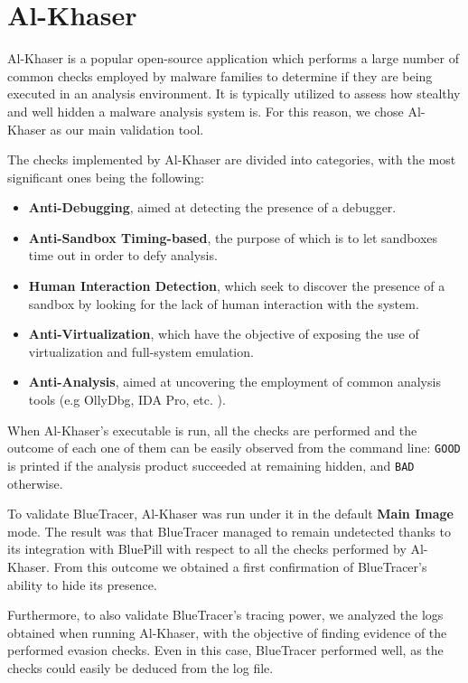 \vspace{-2cm}
\section{Al-Khaser}
Al-Khaser \cite{AlK} is a popular open-source application which performs a large number of common checks employed by malware families to determine if they are being executed in an analysis environment. It is typically utilized to assess how stealthy and well hidden a malware analysis system is. For this reason, we chose Al-Khaser as our main validation tool.

The checks implemented by Al-Khaser are divided into categories, with the most significant ones being the following:
\begin{itemize}
\item \textbf{Anti-Debugging}, aimed at detecting the presence of a debugger.
\item \textbf{Anti-Sandbox Timing-based}, the purpose of which is to let sandboxes time out in order to defy analysis. 
\item \textbf{Human Interaction Detection}, which seek to discover the presence of a sandbox by looking for the lack of human interaction with the system.
\item \textbf{Anti-Virtualization}, which have the objective of exposing the use of virtualization and full-system emulation. 
\item \textbf{Anti-Analysis}, aimed at uncovering the employment of common analysis tools (e.g OllyDbg, IDA Pro, etc. ).
\end{itemize}  

When Al-Khaser's executable is run, all the checks are performed and the outcome of each one of them can be easily observed from the command line: \texttt{GOOD} is printed if the analysis product succeeded at remaining hidden, and \texttt{BAD} otherwise. 

To validate BlueTracer, Al-Khaser was run under it in the default \textbf{Main Image} mode. The result was that BlueTracer managed to remain undetected thanks to its integration with BluePill with respect to all the checks performed by Al-Khaser. From this outcome we obtained a first confirmation of BlueTracer's ability to hide its presence. 

Furthermore, to also validate BlueTracer's tracing power, we analyzed the logs obtained when running Al-Khaser, with the objective of finding evidence of the performed evasion checks.
Even in this case, BlueTracer performed well, as the checks could easily be deduced from the log file. 

